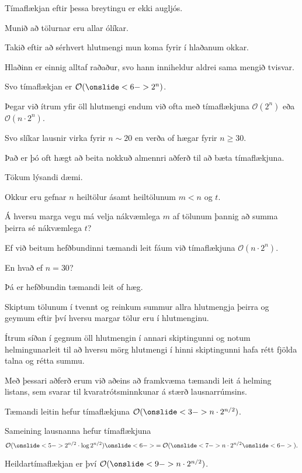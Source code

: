 {
}

{
	{
		\item<1-> Tímaflækjan eftir þessa breytingu er ekki augljós.
		\item<2-> Munið að tölurnar eru allar ólíkar.
		\item<3-> Takið eftir að sérhvert hlutmengi mun koma fyrir í hlaðanum okkar.
		\item<4-> Hlaðinn er einnig alltaf raðaður, svo hann inniheldur aldrei sama mengið tvisvar.
		\item<5-> Svo tímaflækjan er $\mathcal{O}(\onslide<6->{2^n})$.
	}
}

{
	{
		\item<1-> Þegar við ítrum yfir öll hlutmengi endum við ofta með tímaflækjuna $\mathcal{O}(2^n)$ eða $\mathcal{O}(n \cdot 2^n)$.
		\item<2-> Svo slíkar lausnir virka fyrir $n \sim 20$ en verða of hægar fyrir $n \geq 30$.
		\item<3-> Það er þó oft hægt að beita nokkuð almennri aðferð til að bæta tímaflækjuna.
		\item<4-> Tökum lýsandi dæmi.
	}
}

{
	{
		\item<1-> Okkur eru gefnar $n$ heiltölur ásamt heiltölunum $m < n$ og $t$.
		\item<2-> Á hversu marga vegu má velja nákvæmlega $m$ af tölunum þannig að summa þeirra sé nákvæmlega $t$?
		\item<3-> Ef við beitum hefðbundinni tæmandi leit fáum við tímaflækjuna $\mathcal{O}(n \cdot 2^n)$.
		\item<4-> En hvað ef $n = 30$?
		\item<5-> Þá er hefðbundin tæmandi leit of hæg.
	}
}

{
	{
		\item<1-> Skiptum tölunum í tvennt og reinkum summur allra hlutmengja þeirra og geymum eftir því hversu margar tölur eru í hlutmenginu.
		\item<2-> Ítrum síðan í gegnum öll hlutmengin í annari skiptingunni
					og notum helmingunarleit til að hversu mörg hlutmengi í hinni skiptingunni hafa rétt fjölda talna og rétta summu.
	}
}

{
}

{
	{
		\item<1-> Með þessari aðferð erum við aðeins að framkvæma tæmandi leit á helming listans,
					sem svarar til kvaratrótsminnkunar á stærð lausnarrúmsins.
		\item<2-> Tæmandi leitin hefur tímaflækjuna $\mathcal{O}(\onslide<3->{n \cdot 2^{n/2}})$.
		\item<4-> Sameining lausnanna hefur tímaflækjuna
		\[
					\mathcal{O}(
					\onslide<5->{2^{n/2} \cdot \log 2^{n/2}}
					)
					\onslide<6->{ = \mathcal{O}(}
					\onslide<7->{n \cdot 2^{n/2}}
					\onslide<6->{).}
		\]
		\item<8-> Heildartímaflækjan er því $\mathcal{O}(\onslide<9->{n \cdot 2^{n/2}})$.
	}
}

